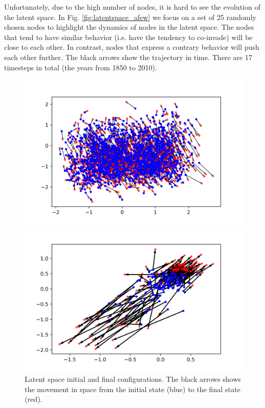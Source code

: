 \documentclass[mscthesis]{usiinfthesis}
\begin{document}
\noindent Unfortunately, due to the high number of nodes, it is hard to see the evolution of the latent space. In Fig. \ref{fig:latentspace_afew} we focus on a set of 25 randomly chosen nodes to highlight the dynamics of nodes in the latent space. The nodes that tend to have similar behavior (i.e. have the tendency to co-invade) will be close to each other. In contrast, nodes that express a contrary behavior will push each other further. The black arrows show the trajectory in time. There are 17 timesteps in total (the years from 1850 to 2010). 

\begin{figure}[H] 
  \begin{minipage}[b]{0.5\linewidth}
    \centering
    \includegraphics[width=\linewidth]{latentspace_species.png} 
    \vspace{4ex}
  \end{minipage}%
  \begin{minipage}[b]{0.5\linewidth}
    \centering
    \includegraphics[width=\linewidth]{latentspace_region.png} 
    \vspace{4ex}
  \end{minipage}  
\caption{Latent space initial and final configurations. The black arrows shows the movement in space from the initial state (blue) to the final state (red).}
\label{fig:latentspace_config}
\end{figure}
\end{document}

